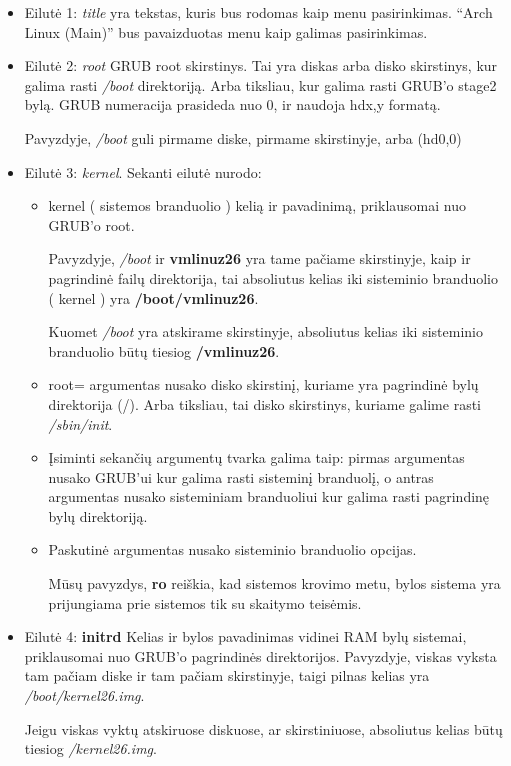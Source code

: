   \begin{itemize}
    \item Eilutė 1: \textsl{title} yra tekstas, kuris bus rodomas kaip
      menu pasirinkimas. ``Arch Linux (Main)'' bus pavaizduotas menu
      kaip galimas pasirinkimas.
    \item Eilutė 2: \textsl{root} GRUB root skirstinys. Tai yra diskas
      arba disko skirstinys, kur galima rasti \textsl{/boot}
      direktoriją. Arba tiksliau, kur galima rasti GRUB'o stage2
      bylą. GRUB numeracija prasideda nuo 0, ir naudoja hdx,y formatą.

      Pavyzdyje, \textsl{/boot} guli pirmame diske, pirmame
      skirstinyje, arba (hd0,0)

    \item Eilutė 3: \textsl{kernel}. Sekanti eilutė nurodo:

      \begin{itemize}
        \item kernel ( sistemos branduolio ) kelią ir pavadinimą,
          priklausomai nuo GRUB'o root.

          Pavyzdyje, \textsl{/boot} ir \textbf{vmlinuz26} yra tame
          pačiame skirstinyje, kaip ir pagrindinė failų direktorija,
          tai absoliutus kelias iki sisteminio branduolio ( kernel )
          yra \textbf{/boot/vmlinuz26}. 

          Kuomet \textsl{/boot} yra atskirame skirstinyje, absoliutus
          kelias iki sisteminio branduolio būtų tiesiog
          \textbf{/vmlinuz26}.

        \item root= argumentas nusako disko skirstinį, kuriame yra
          pagrindinė bylų direktorija (/). Arba tiksliau, tai disko
          skirstinys, kuriame galime rasti \textsl{/sbin/init}.

        \item Įsiminti sekančių argumentų tvarka galima taip: pirmas
          argumentas nusako GRUB'ui kur galima rasti sisteminį
          branduolį, o antras argumentas nusako sisteminiam
          branduoliui kur galima rasti pagrindinę bylų direktoriją. 

        \item Paskutinė argumentas nusako sisteminio branduolio opcijas.

          Mūsų pavyzdys, \textbf{ro} reiškia, kad sistemos krovimo
          metu, bylos sistema yra prijungiama prie sistemos tik su
          skaitymo teisėmis.

      \end{itemize}

    \item  Eilutė 4: \textbf{initrd} Kelias ir bylos pavadinimas
      vidinei RAM bylų sistemai, priklausomai nuo GRUB'o pagrindinės
      direktorijos. Pavyzdyje, viskas vyksta tam pačiam diske ir tam
      pačiam skirstinyje, taigi pilnas kelias yra
      \textsl{/boot/kernel26.img}. 

      Jeigu viskas vyktų atskiruose diskuose, ar skirstiniuose,
      absoliutus kelias būtų tiesiog \textsl{/kernel26.img}.

  \end{itemize}

